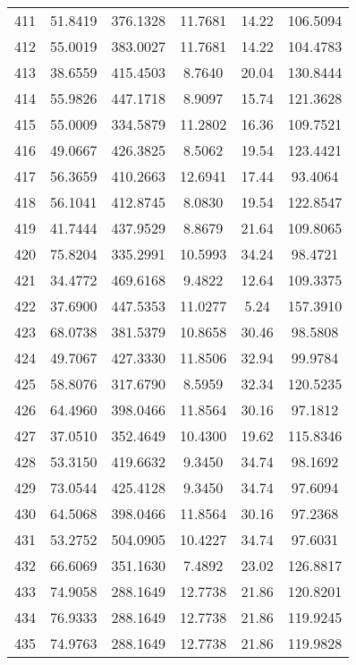 \begin{center}
\begin{footnotesize}
\begin{tabular}{|c|ccccc|}
411 & 51.8419 & 376.1328 & 11.7681 & 14.22 & 106.5094 \\
412 & 55.0019 & 383.0027 & 11.7681 & 14.22 & 104.4783 \\
413 & 38.6559 & 415.4503 & 8.7640 & 20.04 & 130.8444 \\
414 & 55.9826 & 447.1718 & 8.9097 & 15.74 & 121.3628 \\
415 & 55.0009 & 334.5879 & 11.2802 & 16.36 & 109.7521 \\
416 & 49.0667 & 426.3825 & 8.5062 & 19.54 & 123.4421 \\
417 & 56.3659 & 410.2663 & 12.6941 & 17.44 & 93.4064 \\
418 & 56.1041 & 412.8745 & 8.0830 & 19.54 & 122.8547 \\
419 & 41.7444 & 437.9529 & 8.8679 & 21.64 & 109.8065 \\
420 & 75.8204 & 335.2991 & 10.5993 & 34.24 & 98.4721 \\
421 & 34.4772 & 469.6168 & 9.4822 & 12.64 & 109.3375 \\
422 & 37.6900 & 447.5353 & 11.0277 & 5.24 & 157.3910 \\
423 & 68.0738 & 381.5379 & 10.8658 & 30.46 & 98.5808 \\
424 & 49.7067 & 427.3330 & 11.8506 & 32.94 & 99.9784 \\
425 & 58.8076 & 317.6790 & 8.5959 & 32.34 & 120.5235 \\
426 & 64.4960 & 398.0466 & 11.8564 & 30.16 & 97.1812 \\
427 & 37.0510 & 352.4649 & 10.4300 & 19.62 & 115.8346 \\
428 & 53.3150 & 419.6632 & 9.3450 & 34.74 & 98.1692 \\
429 & 73.0544 & 425.4128 & 9.3450 & 34.74 & 97.6094 \\
430 & 64.5068 & 398.0466 & 11.8564 & 30.16 & 97.2368 \\
431 & 53.2752 & 504.0905 & 10.4227 & 34.74 & 97.6031 \\
432 & 66.6069 & 351.1630 & 7.4892 & 23.02 & 126.8817 \\
433 & 74.9058 & 288.1649 & 12.7738 & 21.86 & 120.8201 \\
434 & 76.9333 & 288.1649 & 12.7738 & 21.86 & 119.9245 \\
435 & 74.9763 & 288.1649 & 12.7738 & 21.86 & 119.9828 \\
\hline
\end{tabular}
\end{footnotesize}
\end{center}

